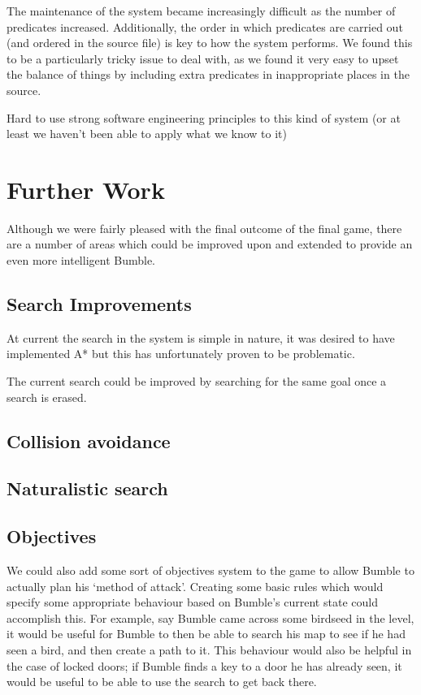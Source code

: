 \documentclass[a4paper,oneside]{report}
\begin{document}
The maintenance of the system became increasingly difficult as the number of predicates increased. Additionally, the order in which predicates are carried out (and ordered in the source file) is key to how the system performs. We found this to be a particularly tricky issue to deal with, as we found it very easy to upset the balance of things by including extra predicates in inappropriate places in the source.

Hard to use strong software engineering principles to this kind of system (or at least we haven't been able to apply what we know to it)

\section{Further Work}

Although we were fairly pleased with the final outcome of the final game, there are a number of areas which could be improved upon and extended to provide an even more intelligent Bumble.
	
\subsection{Search Improvements}

At current the search in the system is simple in nature, it was desired to have implemented A* but this has unfortunately proven to be problematic.
		
The current search could be improved by searching for the same goal once a search is erased.
				
\subsection{Collision avoidance}
		
\subsection{Naturalistic search} 
				
\subsection{Objectives}

We could also add some sort of objectives system to the game to allow Bumble to actually plan his `method of attack'. Creating some basic rules which would specify some appropriate behaviour based on Bumble's current state could accomplish this. For example, say Bumble came across some birdseed in the level, it would be useful for Bumble to then be able to search his map to see if he had seen a bird, and then create a path to it. This behaviour would also be helpful in the case of locked doors; if Bumble finds a key to a door he has already seen, it would be useful to be able to use the search to get back there.
\end{document}
